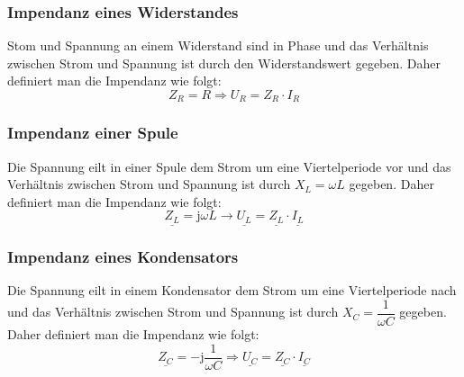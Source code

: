 \subsubsection{Impendanz eines Widerstandes}
Stom und Spannung an einem Widerstand sind in Phase und das Verhältnis zwischen Strom und Spannung ist durch den Widerstandswert gegeben. Daher definiert man die Impendanz wie folgt: 
\begin{equation}
\boxed{Z_R=R\Longrightarrow U_R=Z_R\cdot I_R}
\end{equation}
\subsubsection{Impendanz einer Spule}
Die Spannung eilt in einer Spule dem Strom um eine Viertelperiode vor und das Verhältnis zwischen Strom und Spannung ist durch $X_L=\omega L$ gegeben. Daher definiert man die Impendanz wie folgt:
\begin{equation}
\boxed{\underline{Z_L}=\text{j}\omega L\longrightarrow \underline{U_L}=\underline{Z_L}\cdot \underline{I_L}}
\end{equation}
\subsubsection{Impendanz eines Kondensators}
Die Spannung eilt in einem Kondensator dem Strom um eine Viertelperiode nach und das Verhältnis zwischen Strom und Spannung ist durch $X_C=\dfrac{1}{\omega C}$ gegeben. Daher definiert man die Impendanz wie folgt:
\begin{equation}
\boxed{\underline{Z_C}=-\text{j}\dfrac{1}{\omega C}\Longrightarrow \underline{U_C}=\underline{Z_C}\cdot \underline{I_C}}
\end{equation}
